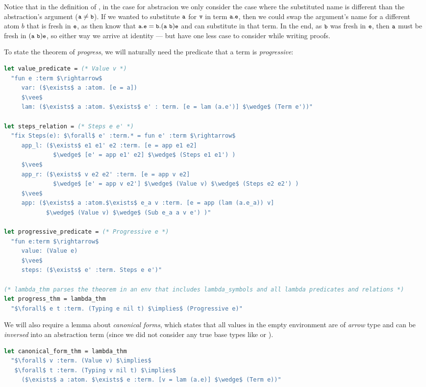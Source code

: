 \documentclass[english, mgr]{iithesis}
\renewcommand{\tt}[1]{\texttt{\small{#1}}}
\newcommand{\lstt}[1]{\text{{\lstinline[columns=fixed,mathescape]|#1|}}}
\renewcommand{\it}[1]{\textit{#1}}
\begin{document}
Notice that in the definition of \lstt{Sub}, in the case for abstracion we only consider the case where the substituted name is different than the abstraction's argument ($\tt{a} \cneq \tt{b}$).
If we wanted to substitute $\tt{a}$ for $\tt{v}$ in term $\tbind{\tt{a}}\tt{e}$, then we could swap the argument's name for a different atom $b$ that is fresh in $\tt{e}$, as then know that $\tbind{\tt{a}}\tt{e} \ceq \tbind{\tt{b}}\permswap{\tt{a}}{\tt{b}}\tt{e}$ and can substitute in that term.
In the end, as $\tt{b}$ was fresh in $\tt{e}$, then $\tt{a}$
must be fresh in $\permswap{\tt{a}}{\tt{b}}\tt{e}$, so either way
we arrive at identity --- but have one less case to consider
while writing proofs.

To state the theorem of \it{progress}, we will naturally need the predicate
that a term is \it{progressive}:
\begin{lstlisting}[mathescape,language=OCaml, escapebegin=\color{codepurple}]
let value_predicate = (* Value v *)
  "fun e :term $\rightarrow$
     var: ($\exists$ a :atom. [e = a])
     $\vee$
     lam: ($\exists$ a :atom. $\exists$ e' : term. [e = lam (a.e')] $\wedge$ (Term e'))"

let steps_relation = (* Steps e e' *)
  "fix Steps(e): $\forall$ e' :term.* = fun e' :term $\rightarrow$
     app_l: ($\exists$ e1 e1' e2 :term. [e = app e1 e2]
              $\wedge$ [e' = app e1' e2] $\wedge$ (Steps e1 e1') )
     $\vee$
     app_r: ($\exists$ v e2 e2' :term. [e = app v e2]
              $\wedge$ [e' = app v e2'] $\wedge$ (Value v) $\wedge$ (Steps e2 e2') )
     $\vee$
     app: ($\exists$ a :atom.$\exists$ e_a v :term. [e = app (lam (a.e_a)) v]
            $\wedge$ (Value v) $\wedge$ (Sub e_a a v e') )"

let progressive_predicate = (* Progressive e *)
  "fun e:term $\rightarrow$
     value: (Value e)
     $\vee$
     steps: ($\exists$ e' :term. Steps e e')"

(* lambda_thm parses the theorem in an env that includes lambda_symbols and all lambda predicates and relations *)
let progress_thm = lambda_thm
  "$\forall$ e t :term. (Typing e nil t) $\implies$ (Progressive e)"
\end{lstlisting}
We will also require a lemma about \it{canonical forms},
which states that all values in the empty environment
are of \it{arrow} type and can be \it{inversed} into an abstraction term
(since we did not consider any true base types like \lstt{Bool} or \lstt{Int}).
\begin{lstlisting}[mathescape,language=OCaml, escapebegin=\color{codepurple}]
let canonical_form_thm = lambda_thm
  "$\forall$ v :term. (Value v) $\implies$
   $\forall$ t :term. (Typing v nil t) $\implies$
     ($\exists$ a :atom. $\exists$ e :term. [v = lam (a.e)] $\wedge$ (Term e))"
\end{lstlisting}
\end{document}
